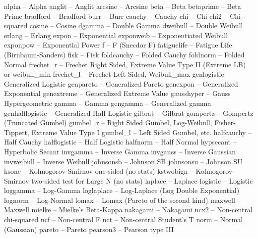 \begin{DoxyVerb}
   alpha             -- Alpha
   anglit            -- Anglit
   arcsine           -- Arcsine
   beta              -- Beta
   betaprime         -- Beta Prime
   bradford          -- Bradford
   burr              -- Burr
   cauchy            -- Cauchy
   chi               -- Chi
   chi2              -- Chi-squared
   cosine            -- Cosine
   dgamma            -- Double Gamma
   dweibull          -- Double Weibull
   erlang            -- Erlang
   expon             -- Exponential
   exponweib         -- Exponentiated Weibull
   exponpow          -- Exponential Power
   f                 -- F (Snecdor F)
   fatiguelife       -- Fatigue Life (Birnbaum-Sanders)
   fisk              -- Fisk
   foldcauchy        -- Folded Cauchy
   foldnorm          -- Folded Normal
   frechet_r         -- Frechet Right Sided, Extreme Value Type II (Extreme LB) or weibull_min
   frechet_l         -- Frechet Left Sided, Weibull_max
   genlogistic       -- Generalized Logistic
   genpareto         -- Generalized Pareto
   genexpon          -- Generalized Exponential
   genextreme        -- Generalized Extreme Value
   gausshyper        -- Gauss Hypergeometric
   gamma             -- Gamma
   gengamma          -- Generalized gamma
   genhalflogistic   -- Generalized Half Logistic
   gilbrat           -- Gilbrat
   gompertz          -- Gompertz (Truncated Gumbel)
   gumbel_r          -- Right Sided Gumbel, Log-Weibull, Fisher-Tippett, Extreme Value Type I
   gumbel_l          -- Left Sided Gumbel, etc.
   halfcauchy        -- Half Cauchy
   halflogistic      -- Half Logistic
   halfnorm          -- Half Normal
   hypsecant         -- Hyperbolic Secant
   invgamma          -- Inverse Gamma
   invgauss          -- Inverse Gaussian
   invweibull        -- Inverse Weibull
   johnsonsb         -- Johnson SB
   johnsonsu         -- Johnson SU
   ksone             -- Kolmogorov-Smirnov one-sided (no stats)
   kstwobign         -- Kolmogorov-Smirnov two-sided test for Large N (no stats)
   laplace           -- Laplace
   logistic          -- Logistic
   loggamma          -- Log-Gamma
   loglaplace        -- Log-Laplace (Log Double Exponential)
   lognorm           -- Log-Normal
   lomax             -- Lomax (Pareto of the second kind)
   maxwell           -- Maxwell
   mielke            -- Mielke's Beta-Kappa
   nakagami          -- Nakagami
   ncx2              -- Non-central chi-squared
   ncf               -- Non-central F
   nct               -- Non-central Student's T
   norm              -- Normal (Gaussian)
   pareto            -- Pareto
   pearson3          -- Pearson type III

\end{DoxyVerb}
